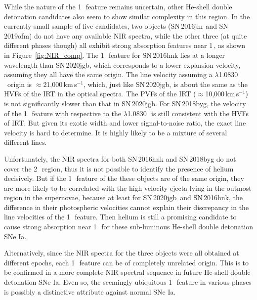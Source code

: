 \documentclass[twocolumn]{aastex631}
\newcommand{\sn}{SN\,2020jgb}
\begin{document}
While the nature of the 1\,\micron\ feature remains uncertain, other He-shell double detonation candidates also seem to show similar complexity in this region. In the currently small sample of five candidates, two objects (SN\,2016jhr and SN\,2019ofm) do not have any available NIR spectra, while the other three (at quite different phases though) all exhibit strong absorption features near 1\,\micron, as shown in Figure~\ref{fig:NIR_comp}. The 1\,\micron\ feature for SN\,2016hnk lies at a longer wavelength than \sn, which corresponds to a lower expansion velocity, assuming they all have the same origin. The line velocity assuming a  $\lambda$1.0830\,\micron\ origin is $\approx$21,000\,km\,s$^{-1}$, which, just like \sn, is about the same as the HVFs of the  IRT in the optical spectra. The PVFs of the  IRT ($\approx$10,000\,km\,s$^{-1}$) is not significantly slower than that in \sn. For SN\,2018byg, the velocity of the 1\,\micron\ feature with respective to the  $\lambda$1.0830\,\micron\ is still consistent with the HVFs of  IRT. But given its exotic width and lower signal-to-noise ratio, the exact line velocity is hard to determine. It is highly likely to be a mixture of several different lines. 

Unfortunately, the NIR spectra for both SN\,2016hnk and SN\,2018byg do not cover the 2\,\micron\ region, thus it is not possible to identify the presence of helium decisively. But if the 1\,\micron\ feature of the these objects are of the same origin, they are more likely to be correlated with the high velocity ejecta lying in the outmost region in the supernovae, because at least for \sn\ and SN\,2016hnk, the difference in their photospheric velocities cannot explain their discrepancy in the line velocities of the 1\,\micron\ feature. Then helium is still a promising candidate to cause strong absorption near 1\,\micron\ for these sub-luminous He-shell double detonation SNe Ia. 

Alternatively, since the NIR spectra for the three objects were all obtained at different epochs, each 1\,\micron\ feature can be of completely unrelated origin. This is to be confirmed in a more complete NIR spectral sequence in future He-shell double detonation SNe Ia. Even so, the seemingly ubiquitous 1\,\micron\ feature in various phases is possibly a distinctive attribute against normal SNe Ia.
\end{document}

